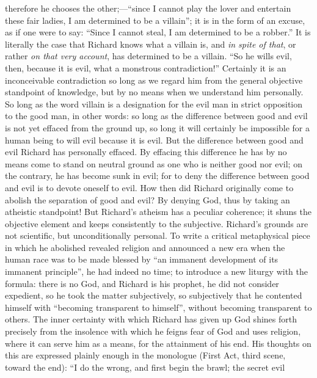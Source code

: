 \documentclass[12pt,a4paper,openany]{book}
\newcommand{\opage}[1]{\marginnote{\footnotesize\textit{[#1]}}}
\begin{document}
therefore he chooses the other;---``since I cannot play the lover
and entertain these fair ladies, I am determined
to be a villain''; it is in the form of an excuse,
as if one were to say: ``Since I cannot steal,
I am determined to be a robber.'' It is literally the case
that Richard knows what a villain is, and \emph{in spite of that},
or rather \emph{on that very account}, has determined to be a
villain. ``So he wills evil, then, because it is
evil, what a monstrous contradiction!'' Certainly it is
an inconceivable contradiction so long as we regard him from
the general objective standpoint of knowledge, but by no means
when we understand him personally. So long as the word
\setcounter{footnote}{0}%
\opage{533}villain is a designation for the evil man in strict opposition
to the good man, in other words: so long as the difference
between good and evil is not yet effaced from
the ground up, so long it will certainly be impossible
for a human being to will evil because it is evil.
But the difference between good and evil Richard has
personally effaced. By effacing this difference he has
by no means come to stand on neutral ground
as one who is neither good nor evil; on the contrary, he has
become sunk in evil; for to deny the difference
between good and evil is to devote oneself to evil. How
then did Richard originally come to abolish
the separation of good and evil? By denying
God, thus by taking an atheistic standpoint! But Richard's atheism has a peculiar coherence;
it shuns the objective element and keeps
consistently to the subjective. Richard's grounds are
not scientific, but unconditionally personal. To
write a critical metaphysical piece in which he abolished
revealed religion and announced a new era
when the human race was to be made blessed by ``an immanent
development of its immanent principle'', he had indeed
no time; to introduce a new liturgy with the formula: there
is no God, and Richard is his prophet, he did not
consider expedient, so he took the matter subjectively,
so subjectively that he contented himself with ``becoming
transparent to himself'', without becoming transparent to others.
The inner certainty with which Richard has given up God
shines forth precisely from the insolence with which he feigns
fear of God and uses religion, where it can serve
him as a means, for the attainment of his end. His
\setcounter{footnote}{0}%
\opage{534}thoughts on this are expressed plainly enough in the monologue (First
Act, third scene, toward the end): ``I do the wrong, and first begin the brawl; the secret evil
\end{document}
